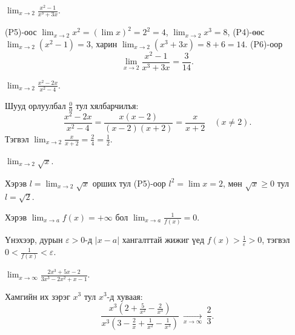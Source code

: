 \begin{example}
$\displaystyle \lim_{x\to 2}\frac{x^2-1}{x^3+3x}$.

(P5)-оос $\lim_{x\to 2}x^2=(\lim x)^2=2^2=4$, $\lim_{x\to 2}x^3=8$, (P4)-өөс $\lim_{x\to 2}(x^2-1)=3$, харин $\lim_{x\to 2}(x^3+3x)=8+6=14$. (P6)-оор
\[
\lim_{x\to 2}\frac{x^2-1}{x^3+3x}=\frac{3}{14}.
\]
\end{example}

\begin{example}
$\displaystyle \lim_{x\to 2}\frac{x^2-2x}{x^2-4}$.

Шууд орлуулбал $\frac{0}{0}$ тул хялбарчилъя:
\[
\frac{x^2-2x}{x^2-4}=\frac{x(x-2)}{(x-2)(x+2)}=\frac{x}{x+2}\quad (x\neq 2).
\]
Тэгвэл $\displaystyle \lim_{x\to 2}\frac{x}{x+2}=\frac{2}{4}=\frac12$.
\end{example}

\begin{example}
$\displaystyle \lim_{x\to 2}\sqrt{x}$.

Хэрэв $l=\lim_{x\to 2}\sqrt{x}$ орших тул (P5)-оор $l^2=\lim x=2$, мөн $\sqrt{x}\ge 0$ тул $l=\sqrt{2}$.
\end{example}

\begin{example}\label{ininf}
Хэрэв $\displaystyle \lim_{x\to a} f(x)=+\infty$ бол $\displaystyle \lim_{x\to a}\frac{1}{f(x)}=0$.

Үнэхээр, дурын $\varepsilon>0$-д $|x-a|$ хангалттай жижиг үед $f(x)>\frac{1}{\varepsilon}>0$, тэгвэл $0<\frac{1}{f(x)}<\varepsilon$.
\end{example}

\begin{example}
$\displaystyle \lim_{x\to \infty}\frac{2x^3+5x-2}{3x^3-2x^2+x-1}$.

Хамгийн их зэрэг $x^3$ тул $x^3$-д хуваая:
\[
\frac{x^3(2+\frac{5}{x^2}-\frac{2}{x^3})}{x^3(3-\frac{2}{x}+\frac{1}{x^2}-\frac{1}{x^3})}
\ \xrightarrow[x\to\infty]{}\ \frac{2}{3}.
\]
\end{example}

